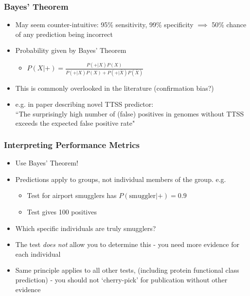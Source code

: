 \documentclass[table]{beamer}
\begin{document}
    \begin{frame}
     \frametitle{Bayes' Theorem}
     \begin{itemize}
       \item May seem counter-intuitive: 95\% sensitivity, 99\% specificity $\implies$ 50\% chance of any prediction being incorrect
       \item Probability given by Bayes' Theorem
       \begin{itemize}
         \item $P(X|+) =  \frac{P(+|X) P(X)}{P(+|X) P(X) + P(+|\bar{X}) P(\bar{X})}$
       \end{itemize}
       \item This is commonly overlooked in the literature (confirmation bias?)
       \item e.g. in paper describing novel TTSS predictor: \\
         ``The surprisingly high number of (false) positives in genomes without TTSS exceeds the expected false positive rate"
     \end{itemize} 
   \end{frame}

    \begin{frame}
     \frametitle{Interpreting Performance Metrics}
     \begin{itemize}
       \item<1-> Use Bayes' Theorem!
       \item<1-> Predictions apply to groups, not individual members of the group. e.g.
       \begin{itemize}
         \item Test for airport smugglers has $P(\text{smuggler}|+) = 0.9$
         \item Test gives 100 positives
       \end{itemize}
       \item<1-> Which specific individuals are truly smugglers?
       \item<2-> The test \emph{does not} allow you to determine this - you need more evidence for each individual
       \item<2->  Same principle applies to all other tests, (including protein functional class prediction) - you should not `cherry-pick' for publication without other evidence
     \end{itemize} 
   \end{frame}
\end{document}
